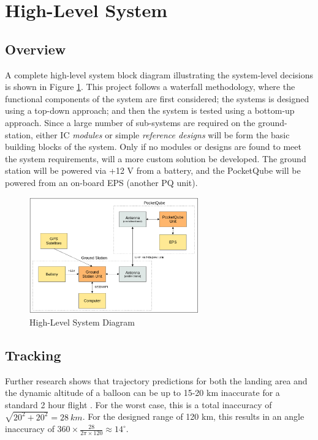\graphicspath{{./figures}}

\section{High-Level System}
\subsection{Overview}
A complete high-level system block diagram illustrating the system-level decisions is shown in Figure \ref{fig:complete_system}. This project follows a waterfall methodology, where the functional components of the system are first considered; the systems is designed using a top-down approach; and then the system is tested using a bottom-up approach. Since a large number of sub-systems are required on the ground-station, either IC \textit{modules} or simple \textit{reference designs} will be form the basic building blocks of the system. Only if no modules or designs are found to meet the system requirements, will a more custom solution be developed. The ground station will be powered via +12 V from a battery, and the PocketQube will be powered from an on-board EPS (another PQ unit).

\begin{figure}[!htb]
    \centering
    \includegraphics[width=0.65\textwidth]{complete_system.png}
    \caption{High-Level System Diagram}
    \label{fig:complete_system}
  \end{figure}

\subsection{Tracking}\label{sec:tracking}
Further research shows that trajectory predictions for both the landing area and the dynamic altitude of a balloon can be up to 15-20 km inaccurate for a standard 2 hour flight \cite{paper-balloonTrajectoryAnalysis}. For the worst case, this is a total inaccuracy of $\sqrt{20^2 + 20^2} = \SI{28}{km}$. For the designed range of 120 km, this results in an angle inaccuracy of $360 \times \frac{28}{2 \pi \times 120} \approx 14^\circ$.

